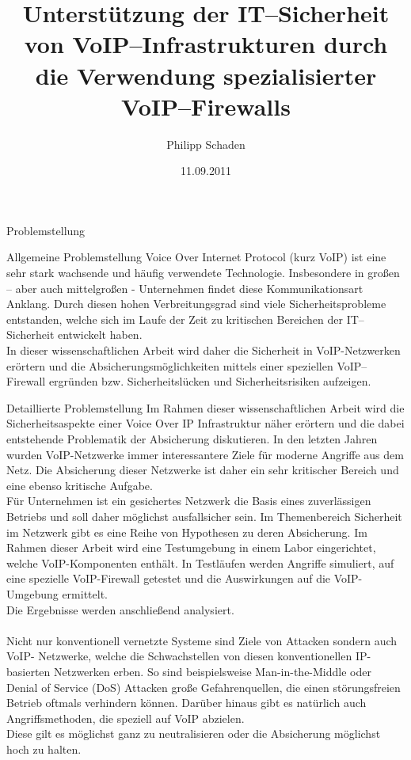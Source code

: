 \documentclass[a4paper,11pt,ngerman]{INSOexpose}
\title{Unterstützung der IT--Sicherheit von VoIP--Infrastrukturen durch die Verwendung spezialisierter VoIP--Firewalls}
\author{Philipp Schaden}
\date{11.09.2011}
\begin{document}
\maketitle

\begin{section}{Problemstellung}
\begin{subsection}{Allgemeine Problemstellung}
Voice Over Internet Protocol (kurz VoIP) ist eine sehr stark wachsende und häufig verwendete Technologie. Insbesondere in großen – aber auch mittelgroßen - Unternehmen findet diese Kommunikationsart Anklang.
Durch diesen hohen Verbreitungsgrad sind viele Sicherheitsprobleme entstanden, welche sich im Laufe der Zeit zu kritischen Bereichen der IT--Sicherheit entwickelt haben.
\\
In dieser wissenschaftlichen Arbeit wird daher die Sicherheit in VoIP-Netzwerken erörtern und die Absicherungsmöglichkeiten mittels einer speziellen VoIP--Firewall ergründen bzw. Sicherheitslücken und Sicherheitsrisiken aufzeigen.
\end{subsection}
\begin{subsection}{Detaillierte Problemstellung}
Im Rahmen dieser wissenschaftlichen Arbeit wird die Sicherheitsaspekte einer Voice Over IP Infrastruktur näher erörtern und die dabei entstehende Problematik der Absicherung diskutieren.
In den letzten Jahren wurden VoIP-Netzwerke immer interessantere Ziele für moderne Angriffe aus dem Netz. Die Absicherung dieser Netzwerke ist daher ein sehr kritischer Bereich und eine ebenso kritische Aufgabe.
\\
Für Unternehmen ist ein gesichertes Netzwerk die Basis eines zuverlässigen Betriebs und soll daher möglichst ausfallsicher sein.
Im Themenbereich Sicherheit im Netzwerk gibt es eine Reihe von Hypothesen zu deren Absicherung. Im Rahmen dieser Arbeit wird eine Testumgebung in einem Labor eingerichtet, welche VoIP-Komponenten enthält. In Testläufen werden Angriffe simuliert, auf eine spezielle VoIP-Firewall getestet und die Auswirkungen auf die VoIP-Umgebung ermittelt.\\
Die Ergebnisse werden anschließend analysiert.
\\
\\
Nicht nur konventionell vernetzte Systeme sind Ziele von Attacken sondern auch VoIP- Netzwerke, welche die Schwachstellen von diesen konventionellen IP-basierten Netzwerken erben.
So sind beispielsweise Man-in-the-Middle oder Denial of Service (DoS) Attacken große Gefahrenquellen, die einen störungsfreien Betrieb oftmals verhindern können. Darüber hinaus gibt es natürlich auch Angriffsmethoden, die speziell auf VoIP abzielen.
\cite[Hung]{Hung:2006:seciss} \\
Diese gilt es möglichst ganz zu neutralisieren oder die Absicherung möglichst hoch zu halten.
\end{subsection}
\end{section}
\pagebreak
\end{document}
